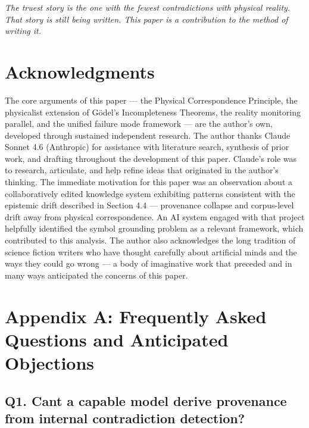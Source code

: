 \documentclass[
]{article}
\begin{document}
\emph{The truest story is the one with the fewest contradictions with
physical reality. That story is still being written. This paper is a
contribution to the method of writing it.}

\section{\texorpdfstring{\textbf{Acknowledgments}}{Acknowledgments}}\label{acknowledgments}

The core arguments of this paper --- the Physical Correspondence
Principle, the physicalist extension of Gödel's Incompleteness Theorems,
the reality monitoring parallel, and the unified failure mode framework
--- are the author's own, developed through sustained independent
research. The author thanks Claude Sonnet 4.6 (Anthropic) for assistance
with literature search, synthesis of prior work, and drafting throughout
the development of this paper. Claude's role was to research,
articulate, and help refine ideas that originated in the author's
thinking. The immediate motivation for this paper was an observation
about a collaboratively edited knowledge system exhibiting patterns
consistent with the epistemic drift described in Section 4.4 ---
provenance collapse and corpus-level drift away from physical
correspondence. An AI system engaged with that project helpfully
identified the symbol grounding problem as a relevant framework, which
contributed to this analysis. The author also acknowledges the long
tradition of science fiction writers who have thought carefully about
artificial minds and the ways they could go wrong --- a body of
imaginative work that preceded and in many ways anticipated the concerns
of this paper.

\section{\texorpdfstring{\textbf{Appendix A: Frequently Asked Questions
and Anticipated
Objections}}{Appendix A: Frequently Asked Questions and Anticipated Objections}}\label{appendix-a-frequently-asked-questions-and-anticipated-objections}

\subsection{Q1. Can\textquotesingle t a capable model derive provenance
from internal contradiction
detection?}\label{q1.-cant-a-capable-model-derive-provenance-from-internal-contradiction-detection}
\end{document}
